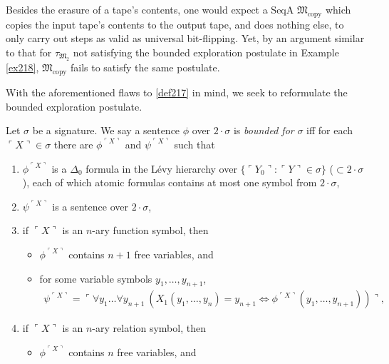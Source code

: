 \documentclass[12pt]{article}
\numberwithin{equation}{section}
\begin{document}
Besides the erasure of a tape's contents, one would expect a SeqA $\mathfrak{M}_{\text{copy}}$ which copies the input tape's contents to the output tape, and does nothing else, to only carry out steps as valid as universal bit-flipping. Yet, by an argument similar to that for $\tau_{\mathfrak{M}_2}$ not satisfying the bounded exploration postulate in Example \ref{ex218}, $\mathfrak{M}_{\text{copy}}$ fails to satisfy the same postulate. 

With the aforementioned flaws to \ref{def217} in mind, we seek to reformulate the bounded exploration postulate.

\begin{defi}\label{def220}
Let $\sigma$ be a signature. We say a sentence $\phi$ over $2 \cdot \sigma$ is \emph{bounded for} $\sigma$ iff for each $\ulcorner X \urcorner \in \sigma$ there are $\phi^{\ulcorner X \urcorner}$ and $\psi^{\ulcorner X \urcorner}$ such that
\begin{enumerate}[label=(\alph*)]
    \item\label{82161} $\phi^{\ulcorner X \urcorner}$ is a $\Delta_0$ formula in the L\'{e}vy hierarchy over $\{\ulcorner Y_0 \urcorner : \ulcorner Y \urcorner \in \sigma\}$ ($\subset 2 \cdot \sigma$), each of which atomic formulas contains at most one symbol from $2 \cdot \sigma$,
    \item $\psi^{\ulcorner X \urcorner}$ is a sentence over $2 \cdot \sigma$,
    \item\label{82163} if $\ulcorner X \urcorner$ is an $n$-ary function symbol, then 
    \begin{itemize}[label=$\circ$, leftmargin=20pt]
        \item $\phi^{\ulcorner X \urcorner}$ contains $n + 1$ free variables, and
        \item for some variable symbols $y_1, \dots, y_{n+1}$,
        \begin{align*}
            \psi^{\ulcorner X \urcorner} = \ulcorner \forall y_1 \dots \forall y_{n+1} \ (X_1(y_1, \dots, y_n) = y_{n+1} \iff \phi^{\ulcorner X \urcorner}(y_1, \dots, y_{n+1})) \urcorner \text{,}
        \end{align*}
    \end{itemize}
    \item if $\ulcorner X \urcorner$ is an $n$-ary relation symbol, then 
    \begin{itemize}[label=$\circ$, leftmargin=20pt]
        \item $\phi^{\ulcorner X \urcorner}$ contains $n$ free variables, and

\end{itemize}
\end{enumerate}
\end{defi}
\end{document}

